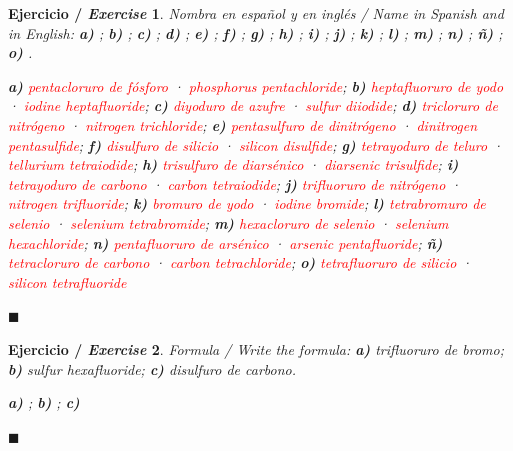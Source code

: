 \documentclass[12pt]{article}
\theoremstyle{mygreennumbox}
\newtheorem{ejercicioT}{Ejercicio / \textit{Exercise}}[section]
\newenvironment{exercise}{\begin{eBoxmygreen}\begin{ejercicioT}}{\hfill{\color{mygreen}\tiny\ensuremath{\blacksquare}}\end{ejercicioT}\end{eBoxmygreen}}
\newcommand{\en}[1]{\textit{#1}}
\begin{document}
\begin{exercise}
    Nombra en español y en inglés / \en{Name in Spanish and in English}: \textbf{a)} ; \textbf{b)} ; \textbf{c)} ; \textbf{d)} ; \textbf{e)} ; \textbf{f)} ; \textbf{g)} ; \textbf{h)} ; \textbf{i)} ; \textbf{j)} ; \textbf{k)} ; \textbf{l)} ; \textbf{m)} ; \textbf{n)} ; \textbf{ñ)} ; \textbf{o)} .
    \begin{solu}
        \textbf{a)} \textcolor{red}{pentacloruro de fósforo} · \textcolor{red}{\en{phosphorus pentachloride}}; \textbf{b)} \textcolor{red}{heptafluoruro de yodo} · \textcolor{red}{\en{iodine heptafluoride}}; \textbf{c)} \textcolor{red}{diyoduro de azufre} · \textcolor{red}{\en{sulfur diiodide}}; \textbf{d)} \textcolor{red}{tricloruro de nitrógeno} · \textcolor{red}{\en{nitrogen trichloride}}; \textbf{e)} \textcolor{red}{pentasulfuro de dinitrógeno} · \textcolor{red}{\en{dinitrogen pentasulfide}}; \textbf{f)} \textcolor{red}{disulfuro de silicio} · \textcolor{red}{\en{silicon disulfide}}; \textbf{g)} \textcolor{red}{tetrayoduro de teluro} · \textcolor{red}{\en{tellurium tetraiodide}}; \textbf{h)} \textcolor{red}{trisulfuro de diarsénico} · \textcolor{red}{\en{diarsenic trisulfide}}; \textbf{i)} \textcolor{red}{tetrayoduro de carbono} · \textcolor{red}{\en{carbon tetraiodide}}; \textbf{j)} \textcolor{red}{trifluoruro de nitrógeno} · \textcolor{red}{\en{nitrogen trifluoride}}; \textbf{k)} \textcolor{red}{bromuro de yodo} · \textcolor{red}{\en{iodine bromide}}; \textbf{l)} \textcolor{red}{tetrabromuro de selenio} · \textcolor{red}{\en{selenium tetrabromide}}; \textbf{m)} \textcolor{red}{hexacloruro de selenio} · \textcolor{red}{\en{selenium hexachloride}}; \textbf{n)} \textcolor{red}{pentafluoruro de arsénico} · \textcolor{red}{\en{arsenic pentafluoride}}; \textbf{ñ)} \textcolor{red}{tetracloruro de carbono} · \textcolor{red}{\en{carbon tetrachloride}}; \textbf{o)} \textcolor{red}{tetrafluoruro de silicio} · \textcolor{red}{\en{silicon tetrafluoride}}
    \end{solu}
\end{exercise}

\begin{exercise}
    Formula / \en{Write the formula}: \textbf{a)} trifluoruro de bromo; \textbf{b)} \en{sulfur hexafluoride}; \textbf{c)} disulfuro de carbono.
    \begin{solu}
        \textbf{a)} \textcolor{red}{}; \textbf{b)} \textcolor{red}{}; \textbf{c)} \textcolor{red}{}
    \end{solu}
\end{exercise}
\end{document}
